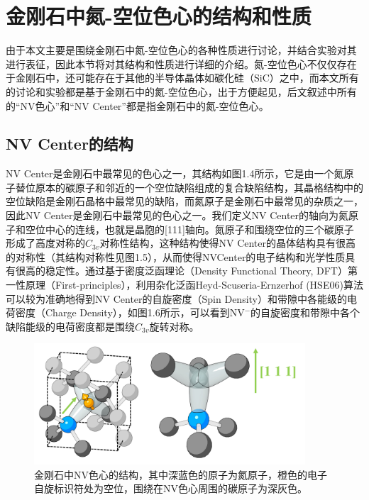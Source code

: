 \documentclass[type = bachelor]{whu-thesis}
\begin{document}
\section{金刚石中氮-空位色心的结构和性质}

由于本文主要是围绕金刚石中氮-空位色心的各种性质进行讨论，并结合实验对其进行表征，因此本节将对其结构和性质进行详细的介绍。氮-空位色心不仅仅存在于金刚石中，还可能存在于其他的半导体晶体如碳化硅（SiC）之中，而本文所有的讨论和实验都是基于金刚石中的氮-空位色心，出于方便起见，后文叙述中所有的“NV色心”和“NV Center”都是指金刚石中的氮-空位色心\cite{von2015identification, csore2017characterization}。

\subsection{NV Center的结构}
NV Center是金刚石中最常见的色心之一，其结构如图1.4所示，它是由一个氮原子替位原本的碳原子和邻近的一个空位缺陷组成的复合缺陷结构，其晶格结构中的空位缺陷是金刚石晶格中最常见的缺陷，而氮原子是金刚石中最常见的杂质之一，因此NV Center是金刚石中最常见的色心之一。我们定义NV Center的轴向为氮原子和空位中心的连线，也就是晶胞的[111]轴向。氮原子和围绕空位的三个碳原子形成了高度对称的$C_{3v}$对称性结构，这种结构使得NV Center的晶体结构具有很高的对称性（其结构对称性见图1.5），从而使得NVCenter的电子结构和光学性质具有很高的稳定性。通过基于密度泛函理论（Density Functional Theory, DFT）第一性原理（First-principles），利用杂化泛函Heyd-Scuseria-Ernzerhof (HSE06)算法可以较为准确地得到NV Center的自旋密度（Spin Density）和带隙中各能级的电荷密度（Charge Density），如图1.6所示，可以看到NV$^-$的自旋密度和带隙中各个缺陷能级的电荷密度都是围绕$C_{3v}$旋转对称\cite{zou2023influence}。

\begin{figure}
  \centering
  \includegraphics[width=0.9\textwidth]{figures/Chapter 1/NV Structure.png}
  \caption{金刚石中NV色心的结构，其中深蓝色的原子为氮原子，橙色的电子自旋标识符处为空位，围绕在NV色心周围的碳原子为深灰色。}
  \label{fig:NV Structure}
\end{figure}
\end{document}
